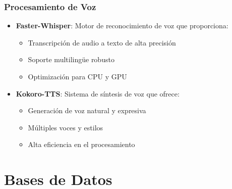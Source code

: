 \subsubsection{Procesamiento de Voz}
\begin{itemize}
	\item \textbf{Faster-Whisper}: Motor de reconocimiento de voz que proporciona:
	      \begin{itemize}
		      \item Transcripción de audio a texto de alta precisión
		      \item Soporte multilingüe robusto
		      \item Optimización para CPU y GPU
	      \end{itemize}

	\item \textbf{Kokoro-TTS}: Sistema de síntesis de voz que ofrece:
	      \begin{itemize}
		      \item Generación de voz natural y expresiva
		      \item Múltiples voces y estilos
		      \item Alta eficiencia en el procesamiento
	      \end{itemize}
\end{itemize}

\section{Bases de Datos}

